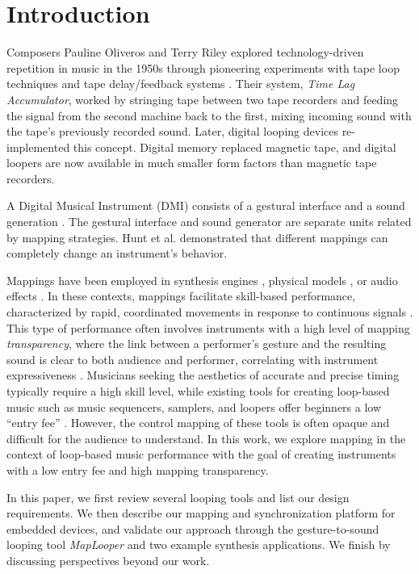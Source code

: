 \documentclass[sigconf]{nimeart}
\begin{document}
\section{Introduction}\label{introduction}

Composers Pauline Oliveros and Terry Riley explored technology-driven repetition in music in the 1950s through pioneering experiments with tape loop techniques and tape delay/feedback systems \cite{c1}. Their system, \emph{Time Lag Accumulator}, worked by stringing tape between two tape recorders and feeding the signal from the second machine back to the first, mixing incoming sound with the tape's previously recorded sound. Later, digital looping devices re-implemented this concept. Digital memory replaced magnetic tape, and digital loopers are now available in much smaller form factors than magnetic tape recorders.

A Digital Musical Instrument (DMI) consists of a gestural interface and a sound generation \cite{c2}. The gestural interface and sound generator are separate units related by mapping strategies. Hunt et al. demonstrated \cite{c3} that different mappings can completely change an instrument's behavior.

Mappings have been employed in synthesis engines \cite{c4}, physical models \cite{c5}, or audio effects \cite{c6}. In these contexts, mappings facilitate skill-based performance, characterized by rapid, coordinated movements in response to continuous signals \cite{c7}. This type of performance often involves instruments with a high level of mapping \emph{transparency}, where the link between a performer's gesture and the resulting sound is clear to both audience and performer, correlating with instrument expressiveness \cite{c8}. Musicians seeking the aesthetics of accurate and precise timing typically require a high skill level, while existing tools for creating loop-based music such as music sequencers, samplers, and loopers offer beginners a low ``entry fee'' \cite{c9}. However, the control mapping of these tools is often opaque and difficult for the audience to understand. In this work, we explore mapping in the context of loop-based music performance with the goal of creating instruments with a low entry fee and high mapping transparency.

In this paper, we first review several looping tools and list our design requirements. We then describe our mapping and synchronization platform for embedded devices, and validate our approach through the gesture-to-sound looping tool \emph{MapLooper} and two example synthesis applications. We finish by discussing perspectives beyond our work.
\end{document}
